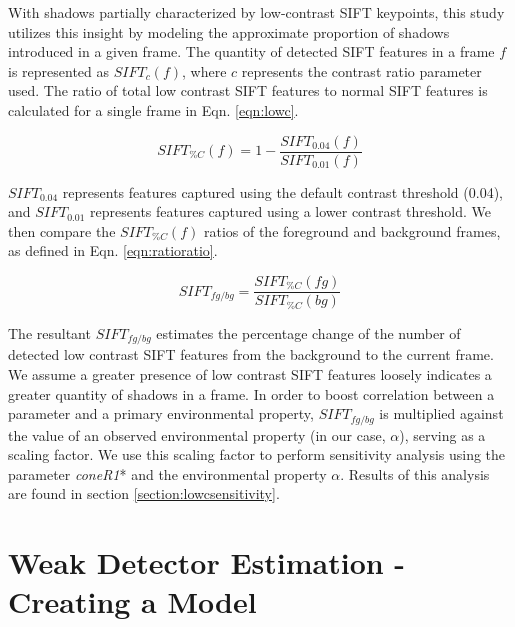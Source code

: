 With shadows partially characterized by low-contrast SIFT keypoints, this study utilizes this insight by modeling the approximate proportion of shadows introduced in a given frame. The quantity of detected SIFT features in a frame $f$ is represented as $SIFT_{c}(f)$, where $c$ represents the contrast ratio parameter used.
The ratio of total low contrast SIFT features to normal SIFT features is calculated for a single frame in Eqn. \ref{eqn:lowc}.

\begin{equation}
SIFT_{\%C}(f) = 1 - \dfrac{SIFT_{0.04}(f)}{SIFT_{0.01}(f)}
\label{eqn:lowc}
\end{equation}

$SIFT_{0.04}$ represents features captured using the default contrast threshold (0.04), and $SIFT_{0.01}$ represents features captured using a lower contrast threshold. We then compare the $SIFT_{\%C}(f)$ ratios of the foreground and background frames, as defined in Eqn. \ref{eqn:ratioratio}.

\begin{equation}
SIFT_{fg/bg} = \dfrac{SIFT_{\%C}(fg)}{SIFT_{\%C}(bg)}
\label{eqn:ratioratio}
\end{equation}

The resultant $SIFT_{fg/bg}$ estimates the percentage change of the number of detected low contrast SIFT features from the background to the current frame. We assume a greater presence of low contrast SIFT features loosely indicates a greater quantity of shadows in a frame. In order to boost correlation between a parameter and a primary environmental property, $SIFT_{fg/bg}$ is multiplied against the value of an observed environmental property (in our case, $\alpha$), serving as a scaling factor. We use this scaling factor to perform sensitivity analysis using the parameter \textit{coneR1}* and the environmental property $\alpha$. Results of this analysis are found in section \ref{section:lowcsensitivity}.

\FloatBarrier
\section{Weak Detector Estimation - Creating a Model} \label{section:model}

